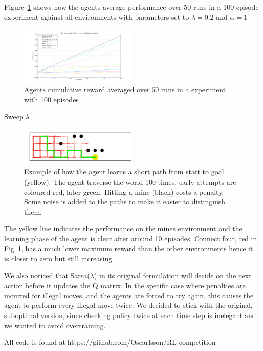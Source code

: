 Figure~\ref{fig:cumreward} shows how the agents average performance over 50 runs in a 100 episode experiment against all environments with parameters set to $\lambda = 0.2$ and $\alpha = 1$

\begin{figure}[h!]
    \centering
    \includegraphics[width=0.5\textwidth]{../data/100episodes_50runs.png}
    \caption{Agents cumulative reward averaged over 50 runs in a experiment with 100 episodes}
    \label{fig:cumreward}
\end{figure}

Sweep $\lambda$
\begin{figure}[h]
    \centering
    \includegraphics[width=0.5\textwidth]{../data/minPlot.png}
    \caption{Example of how the agent learns a short path from start to goal (yellow). The agent traverse the world 100 times, early attempts are coloured red, later green. Hitting a mine (black) costs a penalty. Some noise is added to the paths to make it easier to distinguish them.}
    \label{fig:awesome_image}
\end{figure}

The yellow line indicates the performance on the mines environment and the learning phase of the agent is clear after around 10 episodes. Connect four, red in Fig~\ref{fig:cumreward}, has a much lower maximum reward than the other environments hence it is closer to zero but still increasing.

We also noticed that Sarsa($\lambda$) in its original formulation will decide on the next action before it updates the Q matrix. In the specific case where penalties are incurred for illegal moves, and the agents are forced to try again, this causes the agent to perform every illegal move twice. We decided to stick with the original, suboptimal version, since checking policy twice at each time step is inelegant and we wanted to avoid overtraining.

All code is found at https://github.com/Oscarlsson/RL-competition
